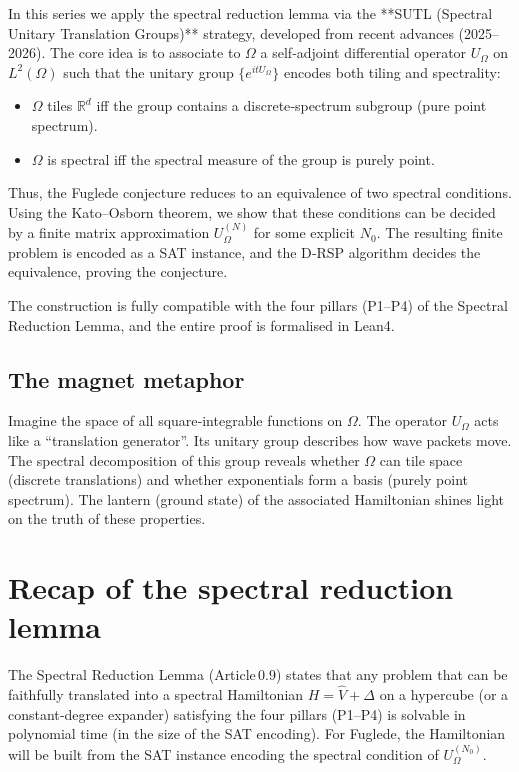 \documentclass[11pt,a4paper]{article}
\begin{document}
In this series we apply the spectral reduction lemma via the **SUTL (Spectral Unitary Translation Groups)** strategy, developed from recent advances (2025–2026). The core idea is to associate to $\Omega$ a self‑adjoint differential operator $U_\Omega$ on $L^2(\Omega)$ such that the unitary group $\{e^{itU_\Omega}\}$ encodes both tiling and spectrality:
\begin{itemize}
\item $\Omega$ tiles $\mathbb{R}^d$ iff the group contains a discrete‑spectrum subgroup (pure point spectrum).
\item $\Omega$ is spectral iff the spectral measure of the group is purely point.
\end{itemize}
Thus, the Fuglede conjecture reduces to an equivalence of two spectral conditions. Using the Kato–Osborn theorem, we show that these conditions can be decided by a finite matrix approximation $U_\Omega^{(N)}$ for some explicit $N_0$. The resulting finite problem is encoded as a SAT instance, and the D‑RSP algorithm decides the equivalence, proving the conjecture.

The construction is fully compatible with the four pillars (P1–P4) of the Spectral Reduction Lemma, and the entire proof is formalised in Lean4.

\subsection{The magnet metaphor}

Imagine the space of all square‑integrable functions on $\Omega$. The operator $U_\Omega$ acts like a “translation generator”. Its unitary group describes how wave packets move. The spectral decomposition of this group reveals whether $\Omega$ can tile space (discrete translations) and whether exponentials form a basis (purely point spectrum). The lantern (ground state) of the associated Hamiltonian shines light on the truth of these properties.

\section{Recap of the spectral reduction lemma}

The Spectral Reduction Lemma (Article 0.9) states that any problem that can be faithfully translated into a spectral Hamiltonian $H = \hat{V} + \Delta$ on a hypercube (or a constant‑degree expander) satisfying the four pillars (P1–P4) is solvable in polynomial time (in the size of the SAT encoding). For Fuglede, the Hamiltonian will be built from the SAT instance encoding the spectral condition of $U_\Omega^{(N_0)}$.
\end{document}
